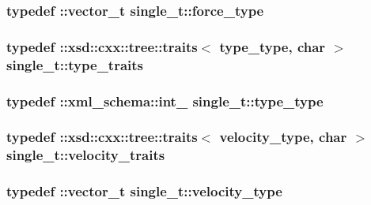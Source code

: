 \subsubsection[{\texorpdfstring{force\+\_\+type}{force_type}}]{\setlength{\rightskip}{0pt plus 5cm}typedef \+::{\bf vector\+\_\+t} {\bf single\+\_\+t\+::force\+\_\+type}}\hypertarget{classsingle__t_a1ed86c81a135e0a683e85f53b882817e}{}\label{classsingle__t_a1ed86c81a135e0a683e85f53b882817e}
\subsubsection[{\texorpdfstring{type\+\_\+traits}{type_traits}}]{\setlength{\rightskip}{0pt plus 5cm}typedef \+::xsd\+::cxx\+::tree\+::traits$<$ {\bf type\+\_\+type}, char $>$ {\bf single\+\_\+t\+::type\+\_\+traits}}\hypertarget{classsingle__t_a5c4f2eba1499ec313d4236b4e6fb8eea}{}\label{classsingle__t_a5c4f2eba1499ec313d4236b4e6fb8eea}
\subsubsection[{\texorpdfstring{type\+\_\+type}{type_type}}]{\setlength{\rightskip}{0pt plus 5cm}typedef \+::{\bf xml\+\_\+schema\+::int\+\_\+} {\bf single\+\_\+t\+::type\+\_\+type}}\hypertarget{classsingle__t_a6ae5872727b5902a3907ef699bcc5ee0}{}\label{classsingle__t_a6ae5872727b5902a3907ef699bcc5ee0}
\subsubsection[{\texorpdfstring{velocity\+\_\+traits}{velocity_traits}}]{\setlength{\rightskip}{0pt plus 5cm}typedef \+::xsd\+::cxx\+::tree\+::traits$<$ {\bf velocity\+\_\+type}, char $>$ {\bf single\+\_\+t\+::velocity\+\_\+traits}}\hypertarget{classsingle__t_ad427fe4b91c2b35163cd993438aba00a}{}\label{classsingle__t_ad427fe4b91c2b35163cd993438aba00a}
\subsubsection[{\texorpdfstring{velocity\+\_\+type}{velocity_type}}]{\setlength{\rightskip}{0pt plus 5cm}typedef \+::{\bf vector\+\_\+t} {\bf single\+\_\+t\+::velocity\+\_\+type}}\hypertarget{classsingle__t_a5aa793b7c32fb659668bbac250ce7d6b}{}\label{classsingle__t_a5aa793b7c32fb659668bbac250ce7d6b}


